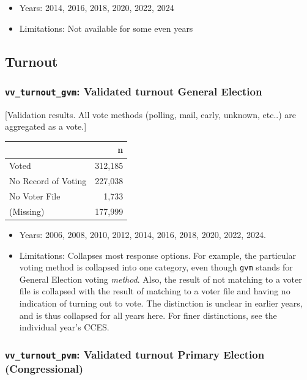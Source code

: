 \documentclass[10pt,article,oneside]{memoir}
\begin{document}
\begin{itemize}
\tightlist
\item
  Years: 2014, 2016, 2018, 2020, 2022, 2024
\item
  Limitations: Not available for some even years
\end{itemize}

\subsection{Turnout}\label{turnout}

\subsubsection{\texorpdfstring{\texttt{vv\_turnout\_gvm}: Validated
turnout General
Election}{vv\_turnout\_gvm: Validated turnout General Election}}\label{vv_turnout_gvm-validated-turnout-general-election}

{[}Validation results. All vote methods (polling, mail, early, unknown,
etc..) are aggregated as a vote.{]}

\begin{table}[H]
\centering
\begin{tabular}[t]{lr}
\toprule
 & n\\
\midrule
Voted & 312,185\\
No Record of Voting & 227,038\\
No Voter File & 1,733\\
(Missing) & 177,999\\
\bottomrule
\end{tabular}
\end{table}

\begin{itemize}
\tightlist
\item
  Years: 2006, 2008, 2010, 2012, 2014, 2016, 2018, 2020, 2022, 2024.
\item
  Limitations: Collapses most response options. For example, the
  particular voting method is collapsed into one category, even though
  \texttt{gvm} stands for General Election voting \emph{method}. Also,
  the result of not matching to a voter file is collapsed with the
  result of matching to a voter file and having no indication of turning
  out to vote. The distinction is unclear in earlier years, and is thus
  collapsed for all years here. For finer distinctions, see the
  individual year's CCES.
\end{itemize}

\subsubsection{\texorpdfstring{\texttt{vv\_turnout\_pvm}: Validated
turnout Primary Election
(Congressional)}{vv\_turnout\_pvm: Validated turnout Primary Election (Congressional)}}\label{vv_turnout_pvm-validated-turnout-primary-election-congressional}
\end{document}
